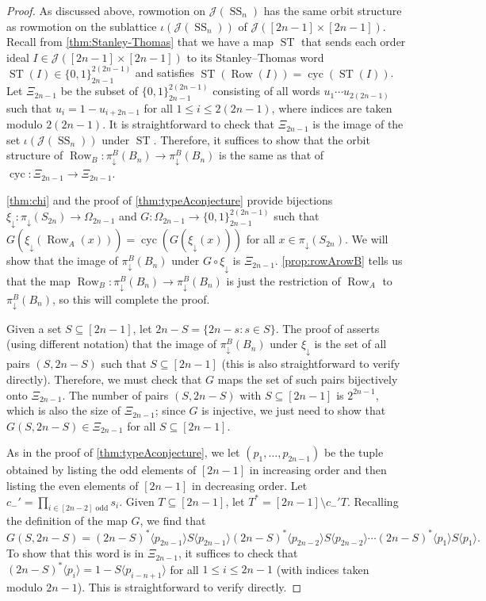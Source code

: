 \documentclass[11pt]{amsart}
\newcommand{\ST}{\operatorname{ST}}
\newcommand{\cyc}{\operatorname{cyc}}
\theoremstyle{definition}
\DeclareMathOperator{\row}{Row}
\DeclareMathOperator{\SSS}{SS}
\begin{document}
\begin{proof}
As discussed above, rowmotion on $\mathcal J(\SSS_n)$ has the same orbit structure as rowmotion on the sublattice $\iota(\mathcal J(\SSS_n))$ of $\mathcal J([2n-1]\times[2n-1])$. Recall from \cref{thm:Stanley-Thomas} that we have a map $\ST$ that sends each order ideal $I\in\mathcal J([2n-1]\times[2n-1])$ to its Stanley--Thomas word $\ST(I)\in\{0,1\}_{2n-1}^{2(2n-1)}$ and satisfies $\ST(\row(I))=\cyc(\ST(I))$. Let $\Xi_{2n-1}$ be the subset of $\{0,1\}_{2n-1}^{2(2n-1)}$ consisting of all words $u_1\cdots u_{2(2n-1)}$ such that $u_{i}=1-u_{i+2n-1}$ for all $1\leq i\leq 2(2n-1)$, where indices are taken modulo $2(2n-1)$. It is straightforward to check that $\Xi_{2n-1}$ is the image of the set $\iota(\mathcal J(\SSS_n))$ under $\ST$. Therefore, it suffices to show that the orbit structure of $\row_B\colon\pi_\downarrow^B(B_n)\to \pi_\downarrow^B(B_n)$ is the same as that of $\cyc\colon \Xi_{2n-1}\to\Xi_{2n-1}$.

\cref{thm:chi} and the proof of \cref{thm:typeAconjecture} provide bijections $\xi_\downarrow\colon\pi_\downarrow(S_{2n})\to\Omega_{2n-1}$ and $G\colon\Omega_{2n-1}\to\{0,1\}_{2n-1}^{2(2n-1)}$ such that $G(\xi_\downarrow(\row_A(x)))=\cyc(G(\xi_\downarrow(x)))$ for all $x\in\pi_\downarrow(S_{2n})$. We will show that the image of $\pi_\downarrow^B(B_n)$ under $G\circ\xi_\downarrow$ is $\Xi_{2n-1}$. \cref{prop:rowArowB} tells us that the map $\row_B\colon\pi_\downarrow^B(B_n)\to \pi_\downarrow^B(B_n)$ is just the restriction of $\row_A$ to $\pi_\downarrow^B(B_n)$, so this will complete the proof. 

Given a set $S\subseteq[2n-1]$, let $2n-S=\{2n-s:s\in S\}$. The proof of \cite[Theorem~3.18]{BarnardReading} asserts (using different notation) that the image of $\pi_\downarrow^B(B_n)$ under $\xi_\downarrow$ is the set of all pairs $(S,2n-S)$ such that $S\subseteq[2n-1]$ (this is also straightforward to verify directly). Therefore, we must check that $G$ maps the set of such pairs bijectively onto $\Xi_{2n-1}$. The number of pairs $(S,2n-S)$ with $S\subseteq [2n-1]$ is $2^{2n-1}$, which is also the size of $\Xi_{2n-1}$; since $G$ is injective, we just need to show that $G(S,2n-S)\in\Xi_{2n-1}$ for all $S\subseteq[2n-1]$. 

As in the proof of \cref{thm:typeAconjecture}, we let $(p_1,\ldots,p_{2n-1})$ be the tuple obtained by listing the odd elements of $[2n-1]$ in increasing order and then listing the even elements of $[2n-1]$ in decreasing order. Let $c_-'=\prod_{i\in[2n-2]\text{ odd}}s_i$. Given $T\subseteq [2n-1]$, let $T^*=[2n-1]\setminus c_-'T$. Recalling the definition of the map $G$, we find that \[G(S,2n-S)=(2n-S)^*\langle p_{2n-1}\rangle S\langle p_{2n-1}\rangle(2n-S)^*\langle p_{2n-2}\rangle S\langle p_{2n-2}\rangle\cdots (2n-S)^*\langle p_1\rangle S\langle p_1\rangle.\] To show that this word is in $\Xi_{2n-1}$, it suffices to check that $(2n-S)^*\langle p_i\rangle=1-S\langle p_{i-n+1}\rangle$ for all $1\leq i \leq 2n-1$ (with indices taken modulo $2n-1$). This is straightforward to verify directly. \end{proof}
\end{document}
